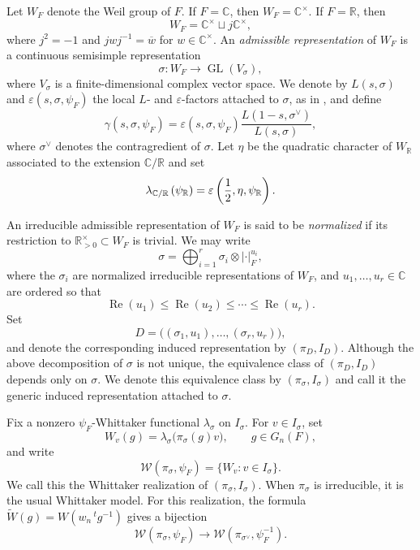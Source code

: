\documentclass[12pt,reqno]{amsart}
\numberwithin{equation}{section}%
\numberwithin{equation}{subsection}
\theoremstyle{definition}
\theoremstyle{remark}
\begin{document}
Let $W_F$ denote the Weil group of $F$. If $F=\mathbb{C}$, then
$W_F=\mathbb{C}^{\times}$. If $F=\mathbb{R}$, then
$$
W_F=\mathbb{C}^{\times}\sqcup j\mathbb{C}^{\times},
$$
where $j^2=-1$ and $jwj^{-1}=\overline{w}
$ for $w\in\mathbb{C}^{\times}.
$
An \emph{admissible representation} of \(W_F\) is a continuous
semisimple representation
\[
\sigma \colon W_F\longrightarrow \operatorname{GL}(V_\sigma),
\]
where \(V_\sigma\) is a finite-dimensional complex vector space. We
denote by \(L(s,\sigma)\) and \(\varepsilon(s,\sigma,\psi_F)\) the local
\(L\)- and \(\varepsilon\)-factors attached to \(\sigma\), as in
\cite{Tate1979}, and define
\[
\gamma(s,\sigma,\psi_F)
=
\varepsilon(s,\sigma,\psi_F)
\frac{L(1-s,\sigma^{\vee})}{L(s,\sigma)},
\]
where \(\sigma^{\vee}\) denotes the contragredient of \(\sigma\).
Let $\eta$ be the quadratic character of $W_\mathbb{R}$ associated to the extension $\mathbb{C}/\mathbb{R}$ and set
\[
\lambda_{\mathbb{C}/\mathbb{R}}\left(\psi_{\mathbb{R}}\right)=\varepsilon\left(\frac{1}{2}, \eta, \psi_{\mathbb{R}}\right) .\]

An irreducible admissible representation of \(W_F\) is said to be
\emph{normalized} if its restriction to
\(\mathbb{R}_{>0}^{\times}\subset W_F\) is trivial. We may write
\[
\sigma
=
\bigoplus_{i=1}^r
\sigma_i\otimes |\cdot|_F^{u_i},
\]
where the \(\sigma_i\) are normalized irreducible representations of
\(W_F\), and \(u_1,\ldots,u_r\in\mathbb{C}\) are ordered so that
\[
\operatorname{Re}(u_1)
\leq
\operatorname{Re}(u_2)
\leq
\cdots
\leq
\operatorname{Re}(u_r).
\]
Set
\[
D
=
\bigl((\sigma_1,u_1),\ldots,(\sigma_r,u_r)\bigr),
\]
and denote the corresponding induced representation by
\((\pi_D,I_D)\). Although the above decomposition of \(\sigma\) is not
unique, the equivalence class of \((\pi_D,I_D)\) depends only on
\(\sigma\). We denote this equivalence class by
\((\pi_\sigma,I_\sigma)\) and call it the generic induced
representation attached to \(\sigma\).

Fix a nonzero \(\psi_F\)-Whittaker functional
\(\lambda_\sigma\) on \(I_\sigma\). For \(v\in I_\sigma\), set
\[
W_v(g)=\lambda_\sigma\bigl(\pi_\sigma(g)v\bigr),
\qquad g\in G_n(F),
\]
and write
\[
\mathcal{W}(\pi_\sigma,\psi_F)
=
\{W_v:v\in I_\sigma\}.
\]
We call this the Whittaker realization of \((\pi_\sigma,I_\sigma)\).
When \(\pi_\sigma\) is irreducible, it is the usual Whittaker model. For this realization, the formula
\(\widetilde W(g)=W\left(w_n\,{}^tg^{-1}\right)\) gives a bijection
\[
\mathcal{W}(\pi_\sigma,\psi_F)
\longrightarrow
\mathcal{W}(\pi_{\sigma^\vee},\psi_F^{-1}).
\]
\end{document}

